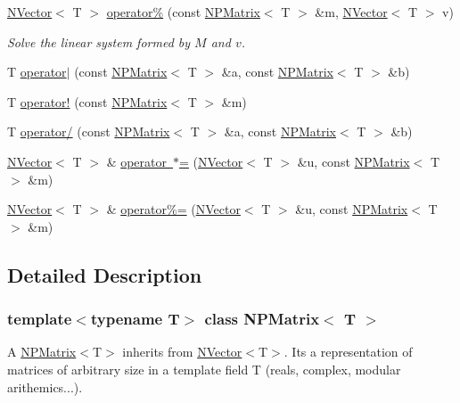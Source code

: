 \begin{DoxyCompactItemize}
\mbox{\hyperlink{class_n_vector}{N\+Vector}}$<$ T $>$ \mbox{\hyperlink{class_n_p_matrix_a15e021ffe286b766ab68b83a6e70d891}{operator\%}} (const \mbox{\hyperlink{class_n_p_matrix}{N\+P\+Matrix}}$<$ T $>$ \&m, \mbox{\hyperlink{class_n_vector}{N\+Vector}}$<$ T $>$ v)
\begin{DoxyCompactList}\small\item\em Solve the linear system formed by $ M $ and $ v $. \end{DoxyCompactList}\item 
T \mbox{\hyperlink{class_n_p_matrix_a89e68801a92b42dbb69eb67a4c4cf0da}{operator$\vert$}} (const \mbox{\hyperlink{class_n_p_matrix}{N\+P\+Matrix}}$<$ T $>$ \&a, const \mbox{\hyperlink{class_n_p_matrix}{N\+P\+Matrix}}$<$ T $>$ \&b)
\item 
T \mbox{\hyperlink{class_n_p_matrix_a0f6cfdff016d49df6c2dbb79e85b9842}{operator!}} (const \mbox{\hyperlink{class_n_p_matrix}{N\+P\+Matrix}}$<$ T $>$ \&m)
\item 
T \mbox{\hyperlink{class_n_p_matrix_a12aeb8ceae55cbd9937701cb056b113b}{operator/}} (const \mbox{\hyperlink{class_n_p_matrix}{N\+P\+Matrix}}$<$ T $>$ \&a, const \mbox{\hyperlink{class_n_p_matrix}{N\+P\+Matrix}}$<$ T $>$ \&b)
\item 
\mbox{\hyperlink{class_n_vector}{N\+Vector}}$<$ T $>$ \& \mbox{\hyperlink{class_n_p_matrix_a3ac1836124d15848447935dd5ab657eb}{operator $\ast$=}} (\mbox{\hyperlink{class_n_vector}{N\+Vector}}$<$ T $>$ \&u, const \mbox{\hyperlink{class_n_p_matrix}{N\+P\+Matrix}}$<$ T $>$ \&m)
\item 
\mbox{\hyperlink{class_n_vector}{N\+Vector}}$<$ T $>$ \& \mbox{\hyperlink{class_n_p_matrix_a4eb92336cc8c489af26d55dd36bd7e90}{operator\%=}} (\mbox{\hyperlink{class_n_vector}{N\+Vector}}$<$ T $>$ \&u, const \mbox{\hyperlink{class_n_p_matrix}{N\+P\+Matrix}}$<$ T $>$ \&m)
\end{DoxyCompactItemize}


\subsection{Detailed Description}
\subsubsection*{template$<$typename T$>$\newline
class N\+P\+Matrix$<$ T $>$}

A {\ttfamily \mbox{\hyperlink{class_n_p_matrix}{N\+P\+Matrix}}$<$T$>$} inherits from {\ttfamily \mbox{\hyperlink{class_n_vector}{N\+Vector}}$<$T$>$}. It\textquotesingle{}s a representation of matrices of arbitrary size in a template field {\ttfamily T} (reals, complex, modular arithemics...). 

